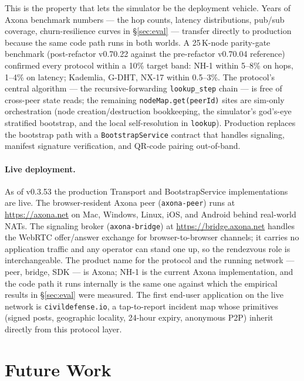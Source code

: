 \documentclass[conference]{IEEEtran}
\newcommand{\axona}{Axona\xspace}
\newcommand{\nhone}{NH-1\xspace}
\newcommand{\GDHT}{G-DHT\xspace}
\begin{document}
This is the property that lets the simulator be the deployment
vehicle. Years of \axona benchmark numbers --- the hop counts,
latency distributions, pub/sub coverage, churn-resilience curves
in \S\ref{sec:eval} --- transfer directly to production because
the same code path runs in both worlds. A 25\,K-node parity-gate
benchmark (post-refactor v0.70.22 against the pre-refactor
v0.70.04 reference) confirmed every protocol within a 10\% target
band: \nhone within 5--8\% on hops, 1--4\% on latency; Kademlia,
\GDHT, NX-17 within 0.5--3\%. The protocol's central algorithm
--- the recursive-forwarding \texttt{lookup\_step} chain --- is
free of cross-peer state reads; the remaining
\texttt{nodeMap.get(peerId)} sites are sim-only orchestration
(node creation/destruction bookkeeping, the simulator's god's-eye
stratified bootstrap, and the local self-resolution in
\texttt{lookup}). Production replaces the bootstrap path with a
\texttt{BootstrapService} contract that handles signaling,
manifest signature verification, and QR-code pairing
out-of-band.

\paragraph{Live deployment.} As of v0.3.53 the production
Transport and BootstrapService implementations are live. The
browser-resident \axona peer (\texttt{axona-peer}) runs at
\url{https://axona.net} on Mac, Windows, Linux, iOS, and Android
behind real-world NATs. The signaling broker
(\texttt{axona-bridge}) at \url{https://bridge.axona.net}
handles the WebRTC offer/answer exchange for browser-to-browser
channels; it carries no application traffic and any operator
can stand one up, so the rendezvous role is interchangeable.
The product name for the protocol and the running network --- peer,
bridge, SDK --- is \axona; \nhone is the current \axona implementation,
and the code path it runs internally is the same one against which the
empirical results in \S\ref{sec:eval} were measured. The first end-user
application on the live network is \texttt{civildefense.io}, a tap-to-report
incident map whose primitives (signed posts, geographic locality,
24-hour expiry, anonymous P2P) inherit directly from this protocol layer.

\section{Future Work}
\label{sec:future}
\end{document}
